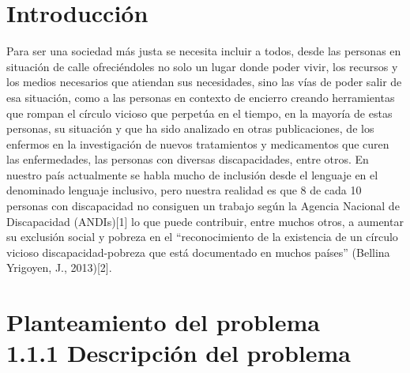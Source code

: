 \documentclass{article}
\begin{document}
\section{\fontsize{12pt}{14pt} Introducción}


{\changefontsizes{8.8pt}
Para ser una sociedad más justa se necesita incluir a todos, desde las personas en situación de calle ofreciéndoles no solo un lugar donde poder vivir, los recursos y los medios necesarios que atiendan sus necesidades, sino las vías de poder salir de esa situación, como a las personas en contexto de encierro creando herramientas que rompan el círculo vicioso que perpetúa en el tiempo, en la mayoría de estas personas, su situación y que ha sido analizado en otras publicaciones, de los enfermos en la investigación de nuevos tratamientos y medicamentos que curen las enfermedades, las personas con diversas discapacidades, entre otros.
En nuestro país actualmente se habla mucho de inclusión desde el lenguaje en el denominado lenguaje inclusivo, pero nuestra realidad es que 8 de cada 10 personas con discapacidad no consiguen un trabajo según la Agencia Nacional de Discapacidad (ANDIs)[1] lo que puede contribuir, entre muchos otros, a aumentar su exclusión social y pobreza en el “reconocimiento de la existencia de un círculo vicioso discapacidad-pobreza que está documentado en muchos países” (Bellina Yrigoyen, J., 2013)[2].
}

\section{\fontsize{10pt}{14pt} Planteamiento del problema\\
1.1.1 Descripción del problema}
\end{document}
